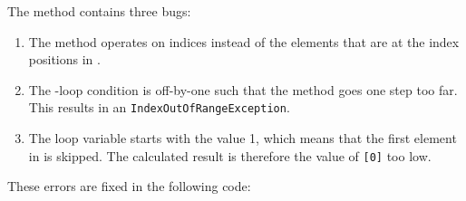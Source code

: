 The  method contains three bugs:
\begin{enumerate}
  \item The method operates on indices instead of the elements that are at the index positions in .
  \item The -loop condition is off-by-one such that the method goes one step too far. This results in an \texttt{IndexOutOfRangeException}.
  \item The loop variable  starts with the value 1, which means that the first element in  is skipped. The calculated result is therefore the value of \texttt{[0]} too low.
\end{enumerate}

These errors are fixed in the following code:
\inputminted{csharp}{\context/answer/Adder.cs}

